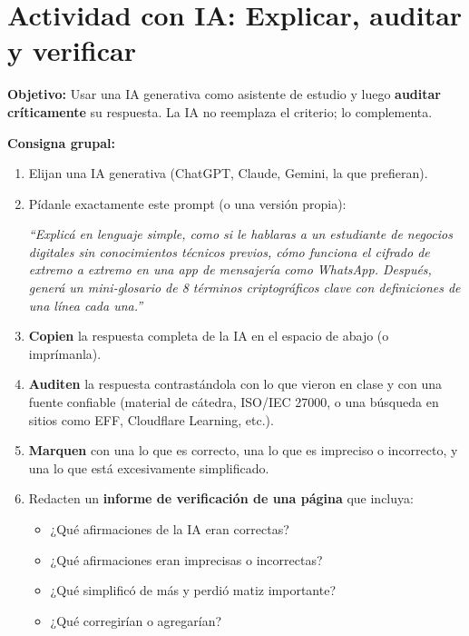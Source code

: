 \documentclass[12pt,a4paper]{article}
\begin{document}
\newpage
\section{Actividad con IA: Explicar, auditar y verificar}

\begin{cajaIA}

\textbf{Objetivo:} Usar una IA generativa como asistente de estudio y luego \textbf{auditar cr\'iticamente} su respuesta. La IA no reemplaza el criterio; lo complementa.

\vspace{8pt}
\textbf{Consigna grupal:}

\begin{enumerate}[leftmargin=2em]
  \item Elijan una IA generativa (ChatGPT, Claude, Gemini, la que prefieran).
  \item P\'idanle exactamente este prompt (o una versi\'on propia):

  \begin{tcolorbox}[colback=white, colframe=violetaIA!50, arc=2mm]
  \small\textit{``Explic\'a en lenguaje simple, como si le hablaras a un estudiante de negocios digitales sin conocimientos t\'ecnicos previos, c\'omo funciona el cifrado de extremo a extremo en una app de mensajería como WhatsApp. Despu\'es, gener\'a un mini-glosario de 8 t\'erminos criptogr\'aficos clave con definiciones de una línea cada una.''}
  \end{tcolorbox}

  \item \textbf{Copien} la respuesta completa de la IA en el espacio de abajo (o impr\'imanla).

  \item \textbf{Auditen} la respuesta contrast\'andola con lo que vieron en clase y con una fuente confiable (material de c\'atedra, ISO/IEC 27000, o una b\'usqueda en sitios como EFF, Cloudflare Learning, etc.).

  \item \textbf{Marquen} con una  lo que es correcto, una  lo que es impreciso o incorrecto, y una  lo que est\'a excesivamente simplificado.

  \item Redacten un \textbf{informe de verificaci\'on de una p\'agina} que incluya:
  \begin{itemize}[leftmargin=1.5em]
    \item ¿Qu\'e afirmaciones de la IA eran correctas?
    \item ¿Qu\'e afirmaciones eran imprecisas o incorrectas?
    \item ¿Qu\'e simplific\'o de más y perdi\'o matiz importante?
    \item ¿Qu\'e corregirían o agregarían?
  \end{itemize}
\end{enumerate}

\end{cajaIA}
\end{document}
